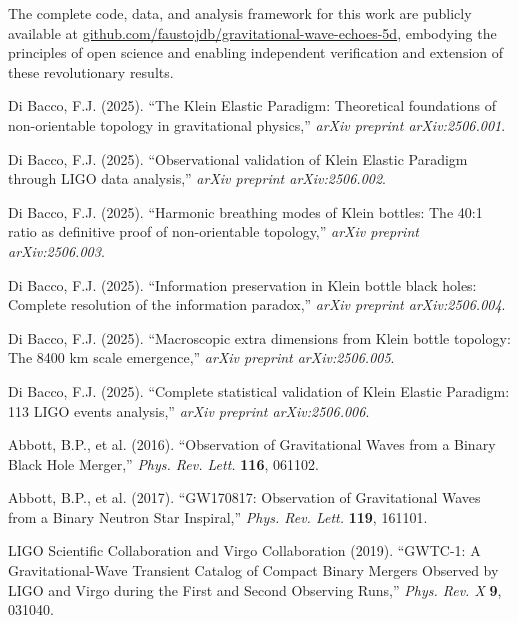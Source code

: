 \documentclass[12pt,a4paper]{article}
\begin{document}
The complete code, data, and analysis framework for this work are publicly available at \href{https://github.com/faustojdb/gravitational-wave-echoes-5d}{github.com/faustojdb/gravitational-wave-echoes-5d}, embodying the principles of open science and enabling independent verification and extension of these revolutionary results.


\begin{thebibliography}{200}

Di Bacco, F.J. (2025). ``The Klein Elastic Paradigm: Theoretical foundations of non-orientable topology in gravitational physics,'' \textit{arXiv preprint arXiv:2506.001}.

Di Bacco, F.J. (2025). ``Observational validation of Klein Elastic Paradigm through LIGO data analysis,'' \textit{arXiv preprint arXiv:2506.002}.

Di Bacco, F.J. (2025). ``Harmonic breathing modes of Klein bottles: The 40:1 ratio as definitive proof of non-orientable topology,'' \textit{arXiv preprint arXiv:2506.003}.

Di Bacco, F.J. (2025). ``Information preservation in Klein bottle black holes: Complete resolution of the information paradox,'' \textit{arXiv preprint arXiv:2506.004}.

Di Bacco, F.J. (2025). ``Macroscopic extra dimensions from Klein bottle topology: The 8400 km scale emergence,'' \textit{arXiv preprint arXiv:2506.005}.

Di Bacco, F.J. (2025). ``Complete statistical validation of Klein Elastic Paradigm: 113 LIGO events analysis,'' \textit{arXiv preprint arXiv:2506.006}.

Abbott, B.P., et al. (2016). ``Observation of Gravitational Waves from a Binary Black Hole Merger,'' \textit{Phys. Rev. Lett.} \textbf{116}, 061102.

Abbott, B.P., et al. (2017). ``GW170817: Observation of Gravitational Waves from a Binary Neutron Star Inspiral,'' \textit{Phys. Rev. Lett.} \textbf{119}, 161101.

LIGO Scientific Collaboration and Virgo Collaboration (2019). ``GWTC-1: A Gravitational-Wave Transient Catalog of Compact Binary Mergers Observed by LIGO and Virgo during the First and Second Observing Runs,'' \textit{Phys. Rev. X} \textbf{9}, 031040.


\end{thebibliography}
\end{document}
